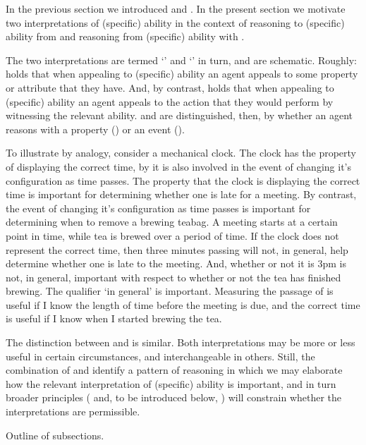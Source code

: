 \begin{note}
  In the previous section we introduced \gsi{-} and .
  In the present section we motivate two interpretations of (specific) ability in the context of reasoning to (specific) ability from \gsi{} and reasoning from (specific) ability with .

  The two interpretations are termed `\AR{}' and `\WR{}' in turn, and are schematic.
  Roughly:
  \AR{} holds that when appealing to (specific) ability an agent appeals to some property or attribute that they have.
  And, by contrast, \WR{} holds that when appealing to (specific) ability an agent appeals to the action that they would perform by witnessing the relevant ability.
  \AR{} and \WR{} are distinguished, then, by whether an agent reasons with a property (\AR{}) or an event (\WR{}).

  To illustrate by analogy, consider a mechanical clock.
  The clock has the property of displaying the correct time, by it is also involved in the event of changing it's configuration as time passes.
  The property that the clock is displaying the correct time is important for determining whether one is late for a meeting.
  By contrast, the event of changing it's configuration as time passes is important for determining when to remove a brewing teabag.
  A meeting starts at a certain point in time, while tea is brewed over a period of time.
  If the clock does not represent the correct time, then three minutes passing will not, in general, help determine whether one is late to the meeting.
  And, whether or not it is 3pm is not, in general, important with respect to whether or not the tea has finished brewing.
  The qualifier `in general' is important.
  Measuring the passage of is useful if I know the length of time before the meeting is due, and the correct time is useful if I know when I started brewing the tea.

  The distinction between \AR{} and \WR{} is similar.
  Both interpretations may be more or less useful in certain circumstances, and interchangeable in others.
  Still, the combination of \gsi{} and  identify a pattern of reasoning in which we may elaborate how the relevant interpretation of (specific) ability is important, and in turn broader principles (\ESU{} and, to be introduced below, \nI{}) will constrain whether the interpretations are permissible.

  {
    \color{red}
    Outline of subsections.
  }
\end{note}


